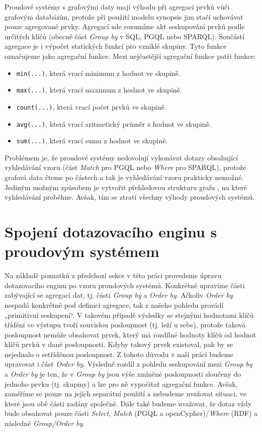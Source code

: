 Proudové systémy s grafovými daty mají výhodu při agregaci prvků vůči grafovým databázím, protože při použití modelu synopsis jim stačí uchovávat pouze agregované prvky. 
Agregací zde rozumíme akt seskupování prvků podle určitých klíčů (obecně část \textit{Group by} v SQL, PGQL nebo SPARQL).
Součástí agregace je i výpočet statických funkcí pro vzniklé skupiny.
Tyto funkce označujeme jako agregační funkce.
Mezi nejčastější agregační funkce patří funkce:
\begin{itemize} 
\item \texttt{min(...)}, která vrací minimum z hodnot ve skupině.
\item \texttt{max(...)}, která vrací maximum z hodnot ve skupině.
\item \texttt{count(...)}, která vrací počet prvků ve skupině.
\item \texttt{avg(...)}, která vrací aritmetický průměr z hodnot ve skupině.
\item \texttt{sum(...)}, která vrací sumu z hodnot ve skupině.
\end{itemize}
Problémem je, že proudové systémy nedovolují vykonávat dotazy obsahující vyhledávání vzoru (část \textit{Match} pro PGQL nebo \textit{Where} pro SPARQL), protože grafová data čteme po částech a tak je vyhledávání vzoru prakticky nemožné.
Jediným možným způsobem je vytvořit přehledovou strukturu grafu \citep{graphsummary}, na které vyhledávání proběhne.
Avšak, tím se ztratí všechny výhody proudových systémů.

\section*{Spojení dotazovacího enginu s proudovým systémem}

Na základě poznatků z předchozí sekce v této práci provedeme úpravu dotazovacího enginu po vzoru proudových systémů.
Konkrétně upravíme části zabývající se agregací dat, tj. části \textit{Group by} a \textit{Order by}.
Ačkoliv \textit{Order by} nespadá konkrétně pod definici agregace, tak z našeho pohledu provádí „primitivní seskupení“.
V takovém případě výsledky se stejnými hodnotami klíčů třídění ve výstupu tvoří souvislou posloupnost (tj. leží u sebe), protože taková posloupnost nemůže obsahovat prvek, který má rozdílné hodnoty klíčů od hodnot klíčů prvků v dané posloupnosti.
Kdyby takový prvek existoval, pak by se nejednalo o setříděnou posloupnost.   
Z tohoto důvodu v naší práci budeme upravovat i část \textit{Order by}.
Výsledně rozdíl z pohledu seskupování mezi \textit{Group by} a \textit{Order by} je ten, že v \textit{Group by} jsou výše zmíněné posloupnosti sloučeny do jednoho prvku (tj. skupiny) a lze pro ně vypočítat agregační funkce. 
Avšak, zaměříme se pouze na jejich separátní použití a nebudeme uvažovat situaci, ve které jsou obě části zadány společně.
Dále také budeme uvažovat, že dotaz vždy bude obsahovat pouze části \textit{Select}, \textit{Match} (PGQL a openCypher)/\textit{Where} (RDF) a následně \textit{Group/Order by}.


